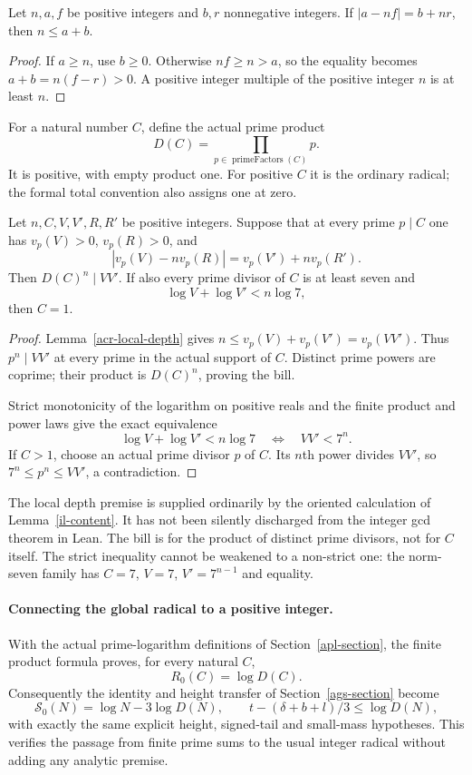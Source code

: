 \begin{lemma}\label{acr-local-depth}
Let $n,a,f$ be positive integers and $b,r$ nonnegative integers.
If $|a-nf|=b+nr$, then $n\le a+b$.
\end{lemma}
\begin{proof}
If $a\ge n$, use $b\ge0$. Otherwise $nf\ge n>a$, so the equality
becomes $a+b=n(f-r)>0$. A positive integer multiple of the positive
integer $n$ is at least $n$.
\end{proof}

For a natural number $C$, define the actual prime product
\[
 D(C)=\prod_{p\in\operatorname{primeFactors}(C)}p.
\]
It is positive, with empty product one. For positive $C$ it is the
ordinary radical; the formal total convention also assigns one at zero.

\begin{proposition}
\label{acr-actual-bill}
Let $n,C,V,V',R,R'$ be positive integers. Suppose that at every prime
$p\mid C$ one has $v_p(V)>0$, $v_p(R)>0$, and
\[
 |v_p(V)-n v_p(R)|=v_p(V')+n v_p(R').
\]
Then $D(C)^n\mid VV'$. If also every prime divisor of $C$ is at least
seven and
\begin{equation}\label{acr-strict-log}
 \log V+\log V'<n\log7,
\end{equation}
then $C=1$.
\end{proposition}
\begin{proof}
Lemma~\ref{acr-local-depth} gives
$n\le v_p(V)+v_p(V')=v_p(VV')$. Thus $p^n\mid VV'$ at every
prime in the actual support of $C$. Distinct prime powers are coprime;
their product is $D(C)^n$, proving the bill.

Strict monotonicity of the logarithm on positive reals and the finite
product and power laws give the exact equivalence
\[
 \log V+\log V'<n\log7\quad\Longleftrightarrow\quad VV'<7^n.
\]
If $C>1$, choose an actual prime divisor $p$ of $C$. Its $n$th power
divides $VV'$, so $7^n\le p^n\le VV'$, a contradiction.
\end{proof}

The local depth premise is supplied ordinarily by the oriented
calculation of Lemma~\ref{il-content}. It has not been silently
discharged from the integer gcd theorem in Lean. The bill is for the
product of distinct prime divisors, not for $C$ itself. The strict
inequality cannot be weakened to a non-strict one: the norm-seven
family has $C=7$, $V=7$, $V'=7^{n-1}$ and equality.

\paragraph{Connecting the global radical to a positive integer.}
With the actual prime-logarithm definitions of Section~\ref{apl-section},
the finite product formula proves, for every natural $C$,
\[
 R_0(C)=\log D(C).
\]
Consequently the identity and height transfer of Section~\ref{ags-section}
become
\[
 \mathcal S_0(N)=\log N-3\log D(N),\qquad
 t-(\delta+b+l)/3\le\log D(N),
\]
with exactly the same explicit height, signed-tail and small-mass
hypotheses. This verifies the passage from finite prime sums to the
usual integer radical without adding any analytic premise.

